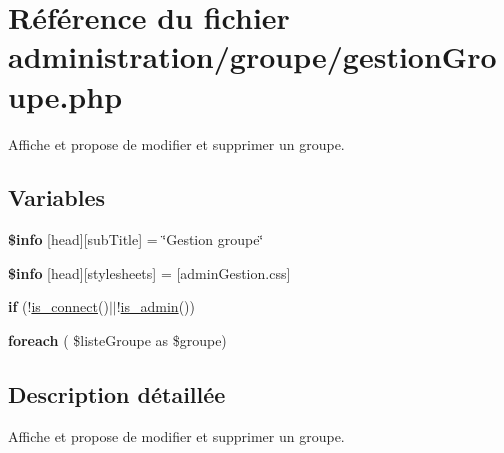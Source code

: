 \hypertarget{gestionGroupe_8php}{}\section{Référence du fichier administration/groupe/gestion\+Groupe.php}
\label{gestionGroupe_8php}


Affiche et propose de modifier et supprimer un groupe.  


\subsection*{Variables}
\begin{DoxyCompactItemize}
\item 
\mbox{\label{gestionGroupe_8php_a024f87f9bf4f3b33710e2e7ff8f60823}} 
{\bfseries \$info} \mbox{[}\textquotesingle{}head\textquotesingle{}\mbox{]}\mbox{[}\textquotesingle{}sub\+Title\textquotesingle{}\mbox{]} = \char`\"{}Gestion groupe\char`\"{}
\item 
\mbox{\label{gestionGroupe_8php_af6044c8bf78ebc8c58057e14d7738bbd}} 
{\bfseries \$info} \mbox{[}\textquotesingle{}head\textquotesingle{}\mbox{]}\mbox{[}\textquotesingle{}stylesheets\textquotesingle{}\mbox{]} = \mbox{[}\textquotesingle{}admin\+Gestion.\+css\textquotesingle{}\mbox{]}
\item 
\mbox{\label{gestionGroupe_8php_af06578d46576ae68ff2e0780832fd8a0}} 
{\bfseries if} (!\hyperlink{fonctionCompte_8php_a2fe594e0482307b8729ea37780d6f74b}{is\+\_\+connect}()$\vert$$\vert$!\hyperlink{fonctionCompte_8php_a0b327581800dba50ad70720e23ae2ed2}{is\+\_\+admin}())
\item 
\mbox{\label{gestionGroupe_8php_a4284354e50a9f006ec08f1c888682cbf}} 
{\bfseries foreach} ( \$liste\+Groupe as \$groupe)
\end{DoxyCompactItemize}


\subsection{Description détaillée}
Affiche et propose de modifier et supprimer un groupe. 

